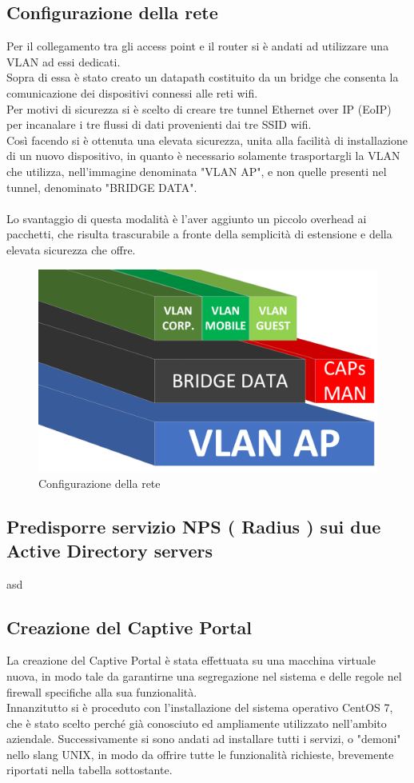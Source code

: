 \documentclass[Realizzazione.tex]{subfiles}
\begin{document}
\subsection{Configurazione della rete}
Per il collegamento tra gli access point e il router si è andati ad utilizzare una VLAN ad essi dedicati. \\
Sopra di essa è stato creato un datapath costituito da un bridge che consenta la comunicazione dei dispositivi connessi alle reti wifi. \\
Per motivi di sicurezza si è scelto di creare tre tunnel Ethernet over IP (EoIP) per incanalare i tre flussi di dati provenienti dai tre SSID wifi. \\
Così facendo si è ottenuta una elevata sicurezza, unita alla facilità di installazione di un nuovo dispositivo, in quanto è necessario solamente trasportargli la VLAN che utilizza, nell'immagine denominata "VLAN AP", e non quelle presenti nel tunnel, denominato "BRIDGE DATA". \\\\
Lo svantaggio di questa modalità è l'aver aggiunto un piccolo overhead ai pacchetti, che risulta trascurabile a fronte della semplicità di estensione e della elevata sicurezza che offre.

\begin{figure}[H]
	\centering
	\includegraphics[width=0.6\linewidth]{"images/VLAN"}
	\caption{Configurazione della rete}
	\label{fig:Configurazione della rete}
\end{figure}

\subsection{Predisporre servizio NPS ( Radius ) sui due Active Directory servers} 
asd
\subsection{Creazione del Captive Portal}
La creazione del Captive Portal è stata effettuata su una macchina virtuale nuova, in modo tale da garantirne una segregazione nel sistema e delle regole nel firewall specifiche alla sua funzionalità. \\
Innanzitutto si è proceduto con l'installazione del sistema operativo CentOS 7, che è stato scelto perché già conosciuto ed ampliamente utilizzato nell'ambito aziendale.
Successivamente si sono andati ad installare tutti i servizi, o "demoni" nello slang UNIX, in modo da offrire tutte le funzionalità richieste, brevemente riportati nella tabella sottostante.
\end{document}
